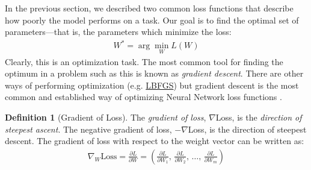 \documentclass[11pt]{article}
\numberwithin{equation}{section}
\theoremstyle{definition}%
\newtheorem{definition}{Definition}[section]%
\newcommand{\Loss}{L}
\begin{document}
In the previous section, we described two common loss functions that describe how poorly the model performs on a task. Our goal is to find the optimal set of parameters---that is, the parameters which minimize the loss:
\begin{align}%
    W^{\ast} = \arg \min_{W} \Loss(W)
\end{align}%
Clearly, this is an optimization task. The most common tool for finding the optimum in a problem such as this is known as \emph{gradient descent}. There are other ways of performing optimization (e.g. \href{https://pytorch.org/docs/stable/generated/torch.optim.LBFGS.html}{LBFGS}) but gradient descent is the most common and established way of optimizing Neural Network loss functions \cite{Stanford}.

\begin{definition}[Gradient of Loss]
    The \emph{gradient of loss}, $\nabla$Loss, is the \emph{direction of steepest ascent}. The negative gradient of loss, $-\nabla$Loss, is the direction of steepest descent. The gradient of loss with respect to the weight vector can be written as:
    \begin{align}
        \nabla_W \text{Loss} = \frac{\partial \Loss}{\partial W} = \left( \frac{\partial \Loss}{\partial W_1},\, \frac{\partial \Loss}{\partial W_2},\, \ldots,\, \frac{\partial \Loss}{\partial W_m} \right)
    \end{align}
\end{definition}
\end{document}
